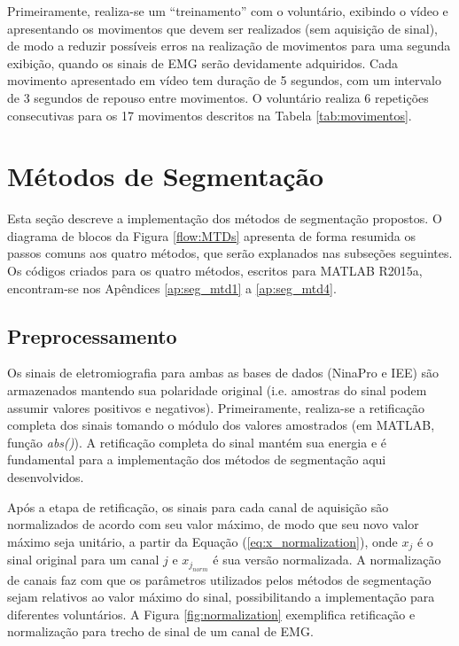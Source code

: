 Primeiramente, realiza-se um ``treinamento'' com o voluntário, exibindo o vídeo e apresentando os movimentos que devem ser realizados (sem aquisição de sinal), de modo a reduzir possíveis erros na realização de movimentos para uma segunda exibição, quando os sinais de EMG serão devidamente adquiridos. Cada movimento apresentado em vídeo tem duração de 5 segundos, com um intervalo de 3 segundos de repouso entre movimentos. O voluntário realiza 6 repetições consecutivas para os 17 movimentos descritos na Tabela \ref{tab:movimentos}.



		\section{Métodos de Segmentação}
Esta seção descreve a implementação dos métodos de segmentação propostos. O diagrama de blocos da Figura \ref{flow:MTDs} apresenta de forma resumida os passos comuns aos quatro métodos, que serão explanados nas subseções seguintes. Os códigos criados para os quatro métodos, escritos para MATLAB R2015a, encontram-se nos Apêndices \ref{ap:seg_mtd1} a \ref{ap:seg_mtd4}.



			\subsection {Preprocessamento}

Os sinais de eletromiografia para ambas as bases de dados (NinaPro e IEE) são armazenados mantendo sua polaridade original (i.e. amostras do sinal podem assumir valores positivos e negativos). Primeiramente, realiza-se a retificação completa dos sinais tomando o módulo dos valores amostrados (em MATLAB, função \emph{abs()}). A retificação completa do sinal mantém sua energia e é fundamental para a implementação dos métodos de segmentação aqui desenvolvidos.

Após a etapa de retificação, os sinais para cada canal de aquisição são normalizados de acordo com seu valor máximo, de modo que seu novo valor máximo seja unitário, a partir da Equação (\ref{eq:x_normalization}), onde $x_j$ é o sinal original para um canal $j$ e $x_{j_{norm}}$ é sua versão normalizada. A normalização de canais faz com que os parâmetros utilizados pelos métodos de segmentação sejam relativos ao valor máximo do sinal, possibilitando a implementação para diferentes voluntários. A Figura \ref{fig:normalization} exemplifica retificação e normalização para trecho de sinal de um canal de EMG.

